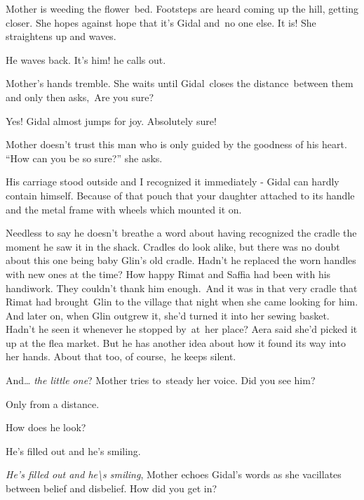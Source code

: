 \documentclass[twoside,11pt]{book}
\begin{document}
Mother is weeding the flower\ bed. Footsteps are heard coming up the hill, getting closer. She hopes against hope that
it's Gidal and{\ }no one else. It is! She straightens up and waves. 

He waves back. {\textquotedbl}It's him!{\textquotedbl} he calls out. 

Mother's hands tremble. She waits until Gidal~closes the distance~between them and only then
asks,{\ }{\textquotedbl}Are you sure?{\textquotedbl} 

{\textquotedbl}Yes!{\textquotedbl} Gidal almost jumps for joy. {\textquotedbl}Absolutely sure!{\textquotedbl} 

Mother doesn't trust this man who is only guided by the goodness of his heart. ``How can you be so sure?'' she asks.

{\textquotedbl}His carriage stood outside and I recognized it immediately -{\textquotedbl} Gidal can hardly contain
himself. {\textquotedbl}Because of that pouch that your daughter attached to its handle and the metal frame with wheels
which mounted it on.{\textquotedbl}

Needless to say he doesn't breathe a word about having recognized the cradle the moment he saw it in the shack. Cradles
do look alike, but there was no doubt about this one being baby Glin's old cradle. Hadn't he replaced the worn handles
with new ones at the time? How happy Rimat and Saffia had been with his handiwork. They couldn't thank him
enough{.\ }And it was in that very cradle that Rimat had
brought{\ }Glin to the village that night when she came looking for him. And
later on, when Glin outgrew it, she'd turned it into her sewing basket. Hadn't he seen it whenever he stopped
by{\ }at{\ }her place? Aera said she'd picked it up at the flea market. But he has
another idea about how it found its way into her hands. About that too, of course,~he keeps silent.~~

{\textquotedbl}And{\dots} \textit{the little one}?{\textquotedbl} Mother tries to~steady her voice.{\textquotedbl} Did
you see him?{\textquotedbl} 

{\textquotedbl}Only from a distance.{\textquotedbl} 

{\textquotedbl}How does he look?{\textquotedbl} 

{\textquotedbl}He's filled out and he's smiling.{\textquotedbl} 

{\textquotedbl}\textit{He's filled out and he{\textbackslash}s smiling},{\textquotedbl} Mother echoes Gidal's words as
she vacillates between belief and disbelief. {\textquotedbl}How did you get in?{\textquotedbl} 
\end{document}

